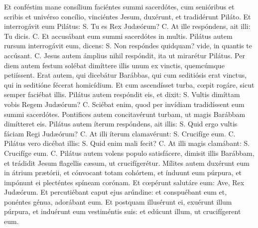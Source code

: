 \begin{paracol}{2}
{Et conféstim mane consílium faciéntes summi sacerdótes, cum senióribus et scribis et univérso concílio, vinciéntes Jesum, duxérunt, et tradidérunt Piláto. Et interrogávit eum Pilátus: {\redx S.} Tu es Rex Judæórum? {\redx C.} At ille respóndens, ait illi: \cruz Tu dicis. {\redx C.} Et accusábant eum summi sacerdótes in multis. Pilátus autem rursum interrogávit eum, dicens: {\redx S.} Non respóndes quidquam? vide, in quantis te accúsant. {\redx C.} Jesus autem ámplius nihil respóndit, ita ut mirarétur Pilátus. Per diem autem festum solébat dimíttere illis unum ex vinctis, quemcúmque petiíssent. Erat autem, qui dicebátur Barábbas, qui cum seditiósis erat vinctus, qui in seditióne fécerat homicídium. Et cum ascendísset turba, cœpit rogáre, sicut semper faciébat illis. Pilátus autem respóndit eis, et dixit: {\redx S.} Vultis dimíttam vobis Regem Judæórum? {\redx C.} Sciébat enim, quod per invídiam tradidíssent eum summi sacerdótes. Pontifices autem concitavérunt turbam, ut magis Barábbam dimítteret eis. Pilátus autem íterum respóndens, ait illis: {\redx S.} Quid ergo vultis fáciam Regi Judæórum? {\redx C.} At illi íterum clamavérunt: {\redx S.} Crucifíge eum. {\redx C.} Pilátus vero dicébat illis: {\redx S.} Quid enim mali fecit? {\redx C.} At illi magis clamábant: {\redx S.} Crucifíge eum. {\redx C.} Pilátus autem volens populo satisfácere, dimisit illis Barábbam, et trádidit Jesum flagellis cæsum, ut crucifígerétur. Mílites autem duxérunt eum in átrium prætórii, et cónvocant totam cohórtem, et índuunt eum púrpura, et impónunt ei plecténtes spíneam corónam. Et cœpérunt salutáre eum: Ave, Rex Judæórum. Et percutiébant caput ejus arúndine: et conspuébant eum et, ponéntes génua, adorábant eum. Et postquam illusérunt ei, exuérunt illum púrpura, et induérunt eum vestiméntis suis: et edúcunt illum, ut crucifígerent eum.
}\switchcolumn\portugues{
}
\end{paracol}
